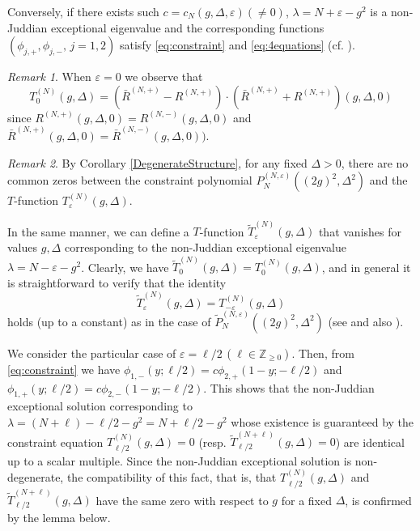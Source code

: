 \documentclass[11pt]{article}
\numberwithin{equation}{section}
\newcommand{\Z}{\mathbb{Z}} %
\newcommand{\e}{\varepsilon}
\theoremstyle{plain}
\theoremstyle{definition}
\theoremstyle{remark}
\newtheorem{rem}{Remark}[section]
\begin{document}
Conversely, if there exists such $c=c_N(g,\Delta,\e)(\not=0)$, $\lambda=N+\e -g^2$ is a non-Juddian exceptional eigenvalue and the corresponding
functions \((\phi_{j,+}, \phi_{j,-}, \, j=1,2)\) satisfy \eqref{eq:constraint} and \eqref{eq:4equations}
(cf. \cite{Ince1956}).

\begin{rem}
  When $\e=0$ we observe that
  \[
    T_0^{(N)}(g,\Delta)= \left(\bar{R}^{(N,+)} -R^{(N,+)} \right) \cdot \left(\bar{R}^{(N,+)} +R^{(N,+)}\right)(g,\Delta,0)
  \]
  since $R^{(N,+)}(g,\Delta,0) = R^{(N,-)}(g,\Delta,0)$ and $\bar{R}^{(N,+)}(g,\Delta,0) = \bar{R}^{(N,-)}(g,\Delta,0))$.
\end{rem}

\begin{rem}
  By Corollary \ref{DegenerateStructure}, for any fixed $\Delta>0$, there are no common zeros between the constraint polynomial
  $P_N^{(N, \e)}((2g)^2, \Delta^2)$ and the $T$-function $T_{\e}^{(N)}(g,\Delta)$.
\end{rem}

In the same manner, we can define a  $T$-function \( \tilde{T}_\e^{(N)}(g,\Delta)\) that vanishes for values \(g,\Delta\) corresponding to
the non-Juddian exceptional eigenvalue \(\lambda = N - \e -g^2\). Clearly, we have $\tilde{T}_0^{(N)}(g,\Delta) = T_0^{(N)}(g,\Delta)$, and in general
it is straightforward to verify that the identity
\begin{equation} \label{eq:GNepsAndGNmeps}
  \tilde{T}_{\e}^{(N)}(g,\Delta) = T_{-\e}^{(N)}(g,\Delta)
\end{equation}
holds (up to a constant) as in the case of  $\tilde{P}_N^{(N,\e)}((2g)^2, \Delta^2)$ (see \cite{W2016JPA} and also \cite{LB2015JPA}).

We consider the particular case of $\e=\ell/2\, (\ell\in \Z_{\geq 0})$. Then, from \eqref{eq:constraint} we have
$\phi_{1,-}(y;\ell/2) =  c \phi_{2,+}(1-y;-\ell/2)$ and $\phi_{1,+}(y;\ell/2) =c \phi_{2,-}(1-y;-\ell/2)$. This shows that the non-Juddian
exceptional solution corresponding to $\lambda=(N+\ell)-\ell/2-g^2=N +\ell/2-g^2$ whose existence is guaranteed by the constraint
equation \(T_{\ell/2}^{(N)}(g,\Delta) = 0\) (resp. \(\tilde{T}_{\ell/2}^{(N+\ell)}(g,\Delta) = 0\)) are identical up to a scalar multiple.
Since the non-Juddian exceptional solution is non-degenerate, the compatibility of this fact, that is, that $T_{\ell/2}^{(N)}(g,\Delta)$
and $\tilde{T}_{\ell/2}^{(N+\ell)}(g,\Delta)$ have the same zero with respect to $g$ for a fixed $\Delta$, is confirmed by the lemma below.
\end{document}
